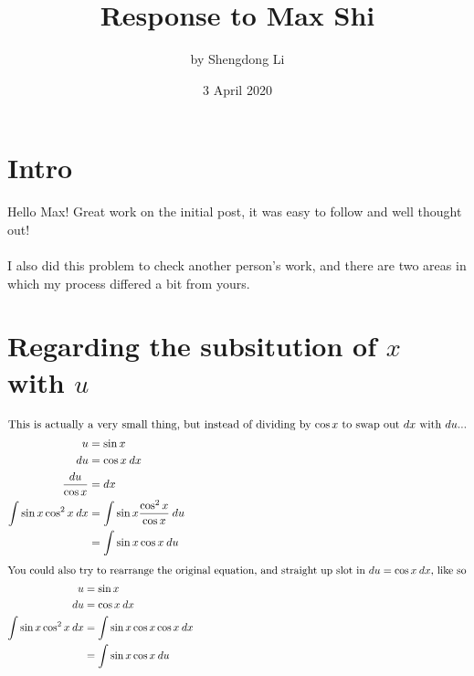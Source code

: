 \documentclass[letterpaper, 12pt]{article}
\begin{document}
\title{Response to Max Shi}
\author{by Shengdong Li}
\date{3 April 2020}
\maketitle

\section{Intro}
Hello Max! Great work on the initial post, it was easy to follow and well thought out! \\~\\
I also did this problem to check another person's work, and there are two areas in which my process differed a bit from yours.

\section{Regarding the subsitution of $x$ with $u$}
\begin{align}
    \intertext{This is actually a very small thing, but instead of dividing by $\cos x$ to swap out $dx$ with $du$...}
    \nonumber u                      & = \sin x                               \\
    \nonumber du                     & = \cos x\:dx                           \\
    \frac{du}{\cos x}                & = dx                                   \\
    \nonumber \int\sin x\cos^2 x\:dx & = \int\sin x\frac{\cos^2x}{\cos x}\:du \\
                                     & =\int \sin x\cos x\:du
\end{align}
\setcounter{equation}{0}
\begin{align}
    \intertext{You could also try to rearrange the original equation, and straight up slot in $du = \cos x\:dx$, like so}
    \nonumber u                      & = \sin x                     \\
    du                               & = \cos x\:dx                 \\
    \nonumber \int\sin x\cos^2 x\:dx & = \int\sin x\cos x\cos x\:dx \\
                                     & = \int\sin x \cos x\:du
\end{align}
\setcounter{equation}{0}
\end{document}
